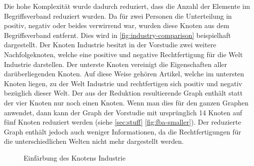 Die hohe Komplexität wurde dadurch reduziert, dass die Anzahl der Elemente im Begriffsverband reduziert wurden.
Da für zwei Personen die Unterteilung in positiv, negativ oder beides verwirrend war, wurden diese Knoten aus dem Begriffsverband entfernt.
Dies wird in \autoref{fig:industry-comparison} beispielhaft dargestellt.
Der Knoten Industrie besitzt in der Vorstudie zwei weitere Nachfolgeknoten, welche eine positive und negative Rechtfertigung für die Welt Industrie darstellen.
Der unterste Knoten vereinigt die Eigenschaften aller darüberliegenden Knoten.
Auf diese Weise gehören Artikel, welche im untersten Knoten liegen, zu der Welt Industrie und rechtfertigen sich positiv und negativ bezüglich dieser Welt.
Der aus der Reduktion resultierende Graph enthält statt der vier Knoten nur noch einen Knoten.
Wenn man dies für den ganzen Graphen anwendet, dann kann der Graph der Vorstudie mit ursprünglich 14 Knoten auf fünf Knoten reduziert werden (siehe \autoref{sec:stuff} \autoref{fig:fba-smaller}).
Der reduzierte Graph enthält jedoch auch weniger Informationen, da die Rechtfertigungen für die unterschiedlichen Welten nicht mehr dargestellt werden. 

\newpage

\begin{figure}[!ht]
    \centering
    \caption{Einfärbung des Knotens Industrie}
    \label{fig:industry-colored}
\end{figure}

